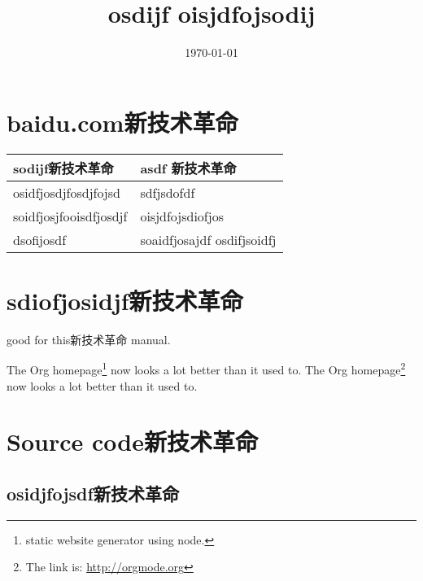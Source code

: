 \documentclass[11pt]{article}
\date{\today}
\title{osdijf oisjdfojsodij}
\begin{document}
\maketitle
\section{baidu.com新技术革命}
\label{sec:orgheadline1}
\begin{center}
\begin{tabular}{ll}
sodijf新技术革命 & asdf 新技术革命\\
\hline
osidfjosdjfosdjfojsd & sdfjsdofdf\\
soidfjosjfooisdfjosdjf & oisjdfojsdiofjos\\
dsofijosdf & soaidfjosajdf osdifjsoidfj\\
\end{tabular}
\end{center}

\section{sdiofjosidjf新技术革命}
\label{sec:orgheadline2}
good for this新技术革命 manual.


The Org homepage\footnote{static website generator using node.} now looks a lot better than it used to.
The Org homepage\footnote{The link is: \url{http://orgmode.org}} now looks a lot better than it used to.

\section{Source code新技术革命}
\label{sec:orgheadline19}
\subsection{osidjfojsdf新技术革命}
\label{sec:orgheadline17}
\end{document}
